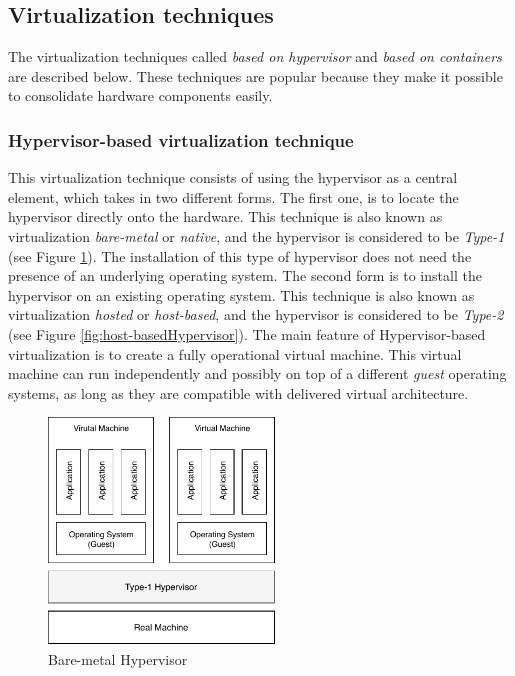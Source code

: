 	\subsection{Virtualization techniques}
	
	The virtualization techniques called \textit{based on hypervisor} and \textit {based on containers} are described below. 
	These techniques are popular because they make it possible to consolidate hardware components easily.
	
	\subsubsection{Hypervisor-based virtualization technique}
	
	This virtualization technique consists of using the hypervisor as a central element, which takes in two different forms. The first one, is to locate the hypervisor directly onto the hardware. 
	This technique is also known as virtualization \textit{bare-metal} or \textit{native}, and the hypervisor is considered to be \textit{Type-1} (see Figure \ref{fig:Bare-metalHypervisor}). 
	The installation of this type of hypervisor does not need the presence of an underlying operating system. The second  form is to install the hypervisor on an existing operating system. 
	This technique is also known as virtualization \textit{hosted} or \textit{host-based}, and the hypervisor is considered to be \textit{Type-2} (see Figure \ref{fig:host-basedHypervisor}). 
	The main feature of Hypervisor-based virtualization is to create a fully operational virtual machine. This virtual machine can run independently and possibly on top of a different \textit{guest} operating systems, as long as they are compatible with delivered virtual architecture.

	\begin{figure}[H]
		\centering
		\includegraphics[width=6cm]{images/bare-metalHypervisor.pdf}
		\vspace{-0.2cm}
		\caption{Bare-metal Hypervisor}
		\label{fig:Bare-metalHypervisor}
	\end{figure}
	
